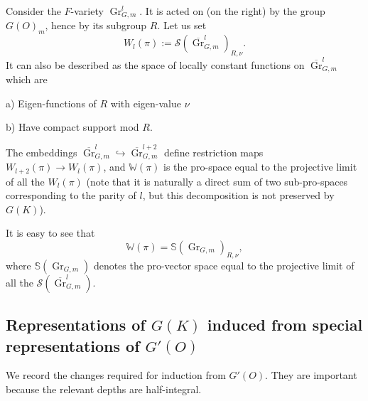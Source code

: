 \documentclass[11pt,a4paper,twoside]{amsart}
\theoremstyle{definition}
\theoremstyle{remark}
\newcommand{\mS}{\mathbb S}
\newcommand{\mW}{\mathbb W}
\newcommand{\mcS}{\mathcal S}
\newcommand{\Gr}{\operatorname{Gr}}
\newcommand{\oGr}{\overline{\Gr}}
\begin{document}
Consider the $F$-variety $\Gr_{G,m}^l$. It is acted on (on the right) by the group $G(O)_m$, hence by its subgroup $R$. Let us set
$$
W_l(\pi):= \mcS (\oGr_{G,m}^l)_{R,\nu}.
$$
It can also be described as the space of locally constant functions on $\oGr_{G,m}^l$ which are

a) Eigen-functions of $R$ with eigen-value $\nu$

b) Have compact support mod $R$.

\noindent
The embeddings $\oGr_{G,m}^l\hookrightarrow \oGr_{G,m}^{l+2}$ define restriction maps $W_{l+2}(\pi)\to W_l(\pi)$, and $\mW(\pi)$ is the pro-space equal to the projective limit of all the $W_l(\pi)$ (note that it is naturally a direct sum of two sub-pro-spaces corresponding to the parity of $l$, but this decomposition is not preserved by $G(K)$).

It is easy to see that
$$
\mW(\pi)=\mS(\Gr_{G,m})_{R,\nu},
$$
where $\mS(\Gr_{G,m})$ denotes the pro-vector space equal to the projective limit of all the $\mcS(\oGr_{G,m}^l)$.

\subsection{Representations of $G(K)$ induced from special representations of $G'(O)$}
We record the changes required for induction from $G'(O)$. They are important because the relevant depths are half-integral.
\end{document}
